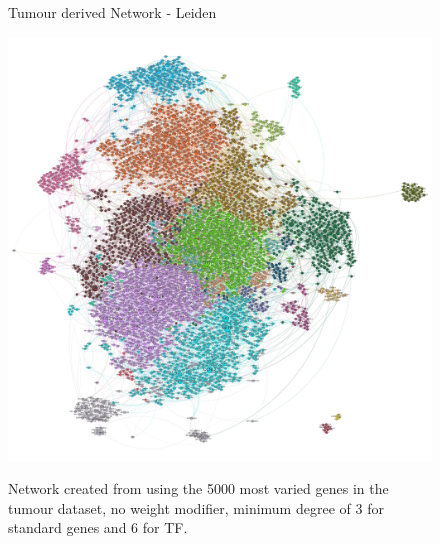 \newpage
{}
\begin{figure}[p]
  \thispagestyle{empty} %
  \centering
  \captionsetup{justification=centering, labelfont=bf}
    \parbox{\textwidth}{\centering \Huge Tumour derived Network - Leiden\vspace{0.5cm} } 
    \label{fig:N_I:tum_net}
  \includegraphics[width=0.9\paperwidth, keepaspectratio]{Sections/Network_pages/images/tum_std_4K_6TF_lowRes.jpg} %
  \parbox{0.8\textwidth}{\centering Network created from using the 5000 most varied genes in the tumour dataset, no weight modifier, minimum degree of 3 for standard genes and 6 for TF.}
\end{figure}
\restoregeometry
\newpage
